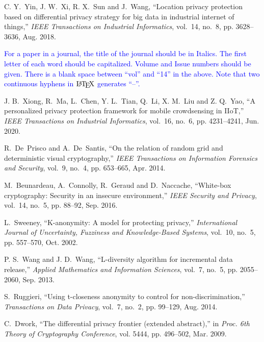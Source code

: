 \documentclass{article}
\begin{document}
\begin{thebibliography}{10}

		C. Y.~Yin, J. W.~Xi, R. X.~Sun and J.~Wang, ``Location privacy protection based on
		differential privacy strategy for big data in industrial internet of
		things,'' \emph{IEEE Transactions on Industrial Informatics}, vol.~14, no.~8,
		pp. 3628--3636, Aug. 2018.
		
		\begin{framed}	
		\textcolor{blue}{For a paper in a journal, the title of the journal should be in Italics. The first letter of each word should be capitalized. Volume and Issue numbers should be given. There is a blank space between ``vol'' and ``14'' in the above. Note that two continuous hyphens in $\text{\LaTeX}$ generates ``--''.  }
		\end{framed}
		
		J. B.~Xiong, R.~Ma, L.~Chen, Y. L.~Tian, Q.~Li, X. M.~Liu and Z. Q.~Yao, ``A personalized
		privacy protection framework for mobile crowdsensing in IIoT,'' \emph{IEEE
			Transactions on Industrial Informatics}, vol.~16, no.~6, pp. 4231--4241, Jun.
		2020.
		
		
		R.~De~Prisco and A.~De~Santis, ``On the relation of random grid and
		deterministic visual cryptography,'' \emph{IEEE Transactions on Information
			Forensics and Security}, vol.~9, no.~4, pp. 653--665, Apr. 2014.
		
		M.~Beunardeau, A.~Connolly, R.~Geraud and D.~Naccache, ``White-box
		cryptography: Security in an insecure environment,'' \emph{IEEE Security and
			Privacy}, vol.~14, no.~5, pp. 88--92, Sep. 2016.
		
		L.~Sweeney, ``K-anonymity: A model for protecting privacy,''
		\emph{International Journal of Uncertainty, Fuzziness and Knowledge-Based
			Systems}, vol.~10, no.~5, pp. 557--570, Oct. 2002.
		
		P. S.~Wang and J. D.~Wang, ``L-diversity algorithm for incremental data release,''
		\emph{Applied Mathematics and Information Sciences}, vol.~7, no.~5, pp.
		2055--2060, Sep. 2013.
		
		S.~Ruggieri, ``Using t-closeness anonymity to control for non-discrimination,''
		\emph{Transactions on Data Privacy}, vol.~7, no.~2, pp.
		99--129, Aug. 2014.
		
		C.~Dwork, ``The differential privacy frontier (extended abstract),'' in
		\emph{Proc. 6th Theory of Cryptography Conference}, vol. 5444, pp. 496--502, Mar. 2009.
		

\end{thebibliography}
\end{document}
